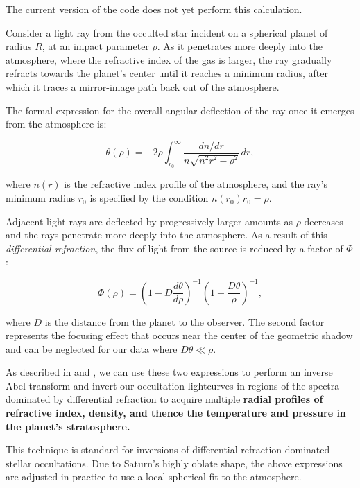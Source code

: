 \documentclass[12pt]{article}
\begin{document}
The current version of the code does not yet perform this calculation.

Consider a light ray from the occulted star incident on a spherical planet of
radius $R$, at an impact parameter $\rho$. As it penetrates more deeply into
the atmosphere, where the refractive index of the gas is larger, the ray
gradually refracts towards the planet's center until it reaches a minimum
radius, after which it traces a mirror-image path back out of the atmosphere.

The formal expression for the overall angular deflection of the ray once it
emerges from the atmosphere is:

\begin{equation}
 \theta(\rho) = -2\rho \int_{r_0}^\infty \frac{dn/dr}{n\sqrt{n^2r^2 - \rho^2}}\, dr,
\end{equation}

\noindent where $n(r)$  is the refractive index profile of the atmosphere,
and the ray's minimum radius $r_0$ is specified by the condition $n(r_0)r_0 = \rho$.

Adjacent light rays are deflected by progressively larger amounts as $\rho$
decreases and the rays penetrate more deeply into the atmosphere. As a result
of this {\it differential refraction}, the flux of light from the source is
reduced by a factor of $\Phi$:

\begin{equation}
 \Phi(\rho) = \left( 1 - D\frac{d\theta}{d\rho} \right)^{-1}\left( 1 - \frac{D\theta}{\rho} \right)^{-1},
\label{eq:iso_flux}
\end{equation}

\noindent where $D$ is the distance from the planet to the observer. The second
factor represents the focusing effect that occurs near the center of the
geometric shadow and can be neglected for our data where $D\theta\ll\rho$.

As described in \cite{Elliot77} and \cite{French78}, we can use these two
expressions to perform an inverse Abel transform and invert our occultation
lightcurves in regions of the spectra dominated by differential refraction to
acquire multiple {\bf radial profiles of refractive index, density, and thence
the temperature and pressure in the planet's stratosphere.}

This technique is standard for inversions of differential-refraction dominated
stellar occultations.  Due to Saturn's highly oblate shape, the above
expressions are adjusted in practice to use a local spherical fit to the
atmosphere.
\end{document}
